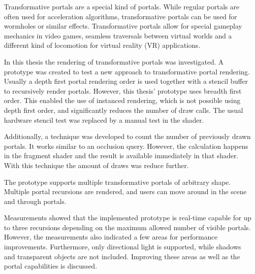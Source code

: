 
Transformative portals are a special kind of portals. While regular portals are often used for acceleration algorithms, transformative portals can be used for wormholes or similar effects. Transformative portals allow for special gameplay mechanics in video games, seamless traversals between virtual worlds and a different kind of locomotion for virtual reality (VR) applications.

In this thesis the rendering of transformative portals was investigated. A prototype was created to test a new approach to transformative portal rendering. Usually a depth first portal rendering order is used together with a stencil buffer to recursively render portals. However, this thesis' prototype uses breadth first order. This enabled the use of instanced rendering, which is not possible using depth first order, and significantly reduces the number of draw calls. The usual hardware stencil test was replaced by a manual test in the shader.

Additionally, a technique was developed to count the number of previously drawn portals. It works similar to an occlusion query. However, the calculation happens in the fragment shader and the result is available immediately in that shader. With this technique the amount of draws was reduce further.

The prototype supports multiple transformative portals of arbitrary shape. Multiple portal recursions are rendered, and users can move around in the scene and through portals.

Measurements showed that the implemented prototype is real-time capable for up to three recursions depending on the maximum allowed number of visible portals. However, the measurements also indicated a few areas for performance improvements. Furthermore, only directional light is supported, while shadows and transparent objects are not included. Improving these areas as well as the portal capabilities is discussed.
